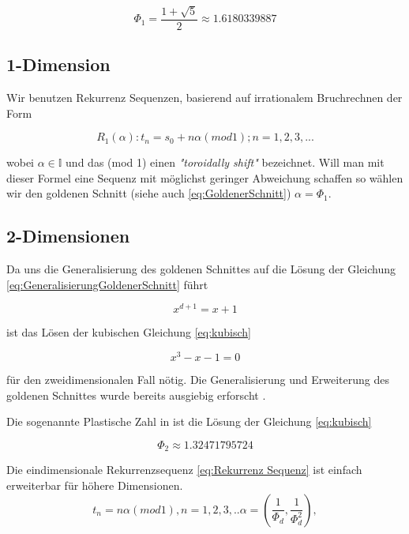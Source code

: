 \begin{equation}\label{eq:GoldenerSchnitt}
    \Phi_{1} = \frac{1 + \sqrt{5}}{2} \approx 1.6180339887
\end{equation}

\label{subsec:1-Dimension}
\subsection{1-Dimension}
Wir benutzen Rekurrenz Sequenzen, basierend auf irrationalem 
Bruchrechnen der Form

\begin{equation}\label{eq:Rekurrenz Sequenz}
    R_{1}(\alpha) : t_n = s_0 + n\alpha(mod 1); n = 1,2,3,...
\end{equation}

wobei $\alpha \in \mathbb{I}$ und das (mod 1) einen \textit{"toroidally shift"}
bezeichnet. Will man mit dieser Formel eine Sequenz mit möglichst geringer
Abweichung schaffen so wählen wir den goldenen Schnitt (siehe auch \ref{eq:GoldenerSchnitt})
$\alpha = \Phi_{1}$.

\label{subsec:2-Dimensionen}
\subsection{2-Dimensionen}

Da uns die Generalisierung des goldenen Schnittes auf die Lösung der Gleichung
\ref{eq:GeneralisierungGoldenerSchnitt} führt

\begin{equation}\label{eq:GeneralisierungGoldenerSchnitt}
    x^{d+1} = x+1
\end{equation}

ist das Lösen der kubischen Gleichung \ref{eq:kubisch}

\begin{equation}\label{eq:kubisch}
    x^{3} - x - 1 = 0
\end{equation}

für den zweidimensionalen Fall nötig. Die Generalisierung und Erweiterung des goldenen 
Schnittes wurde bereits ausgiebig erforscht \cite{krcadinac2006new}.

Die sogenannte Plastische Zahl in ist die Lösung der
Gleichung \ref{eq:kubisch}

\begin{equation}\label{eq:plastische Zahl}
    \Phi_{2} \approx 1.32471795724
\end{equation}

Die eindimensionale Rekurrenzsequenz \ref{eq:Rekurrenz Sequenz} ist einfach erweiterbar 
für höhere Dimensionen.
\begin{equation}\label{eq:1 zu N - Dimensional}
    t_{n} = n\alpha(mod 1), n = 1,2,3,..
    \alpha = (\frac{1}{\Phi_{d}}, \frac{1}{\Phi_{d}^{2}}),
\end{equation}

